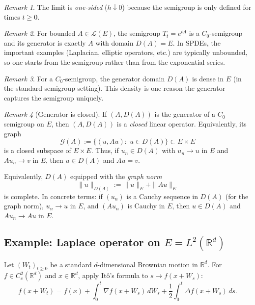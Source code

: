 \documentclass[11pt]{article}
\theoremstyle{definition}
\theoremstyle{remark}
\newtheorem{remark}{Remark}
\begin{document}
\begin{remark}
The limit is \emph{one-sided} ($h\downarrow 0$) because the semigroup is only defined for times $t\ge 0$.
\end{remark}

\begin{remark}
For bounded $A\in\mathcal{L}(E)$, the semigroup $T_t=e^{tA}$ is a $C_0$-semigroup and its generator is exactly $A$ with domain $D(A)=E$.
In SPDEs, the important examples (Laplacian, elliptic operators, etc.) are typically unbounded, so one starts from the semigroup rather than from the exponential series.
\end{remark}

\begin{remark}
For a $C_0$-semigroup, the generator domain $D(A)$ is dense in $E$ (in the standard semigroup setting).
This density is one reason the generator captures the semigroup uniquely.
\end{remark}

\begin{remark}[Generator is closed]
If $(A,D(A))$ is the generator of a $C_0$-semigroup on $E$, then $(A,D(A))$ is a \emph{closed} linear operator.
Equivalently, its graph
\[
    \mathcal{G}(A)
    :=
    \{(u,Au):\; u\in D(A)\}
    \subset E\times E
\]
is a closed subspace of $E\times E$.
Thus, if $u_n\in D(A)$ with $u_n\to u$ in $E$ and $Au_n\to v$ in $E$, then $u\in D(A)$ and $Au=v$.

Equivalently, $D(A)$ equipped with the \emph{graph norm}
\[
    \|u\|_{D(A)} := \|u\|_E + \|Au\|_E
\]
is complete. In concrete terms: if $(u_n)$ is a Cauchy sequence in $D(A)$ (for the graph norm), $u_n\to u$ in $E$, and $(Au_n)$ is Cauchy in $E$,
then $u\in D(A)$ and $Au_n\to Au$ in $E$.
\end{remark}

\subsection*{Example: Laplace operator on $E=L^2(\mathbb{R}^d)$}

Let $(W_t)_{t\ge 0}$ be a standard $d$-dimensional Brownian motion in $\mathbb{R}^d$.
For $f \in C_c^2(\mathbb{R}^d)$ and $x\in\mathbb{R}^d$, apply It\^o's formula to $s\mapsto f(x+W_s)$:
\begin{equation}\label{eq:ito-heat-example}
    f(x+W_t)
    =
    f(x)
    + \int_0^t \nabla f(x+W_s)\,dW_s
    + \frac12 \int_0^t \Delta f(x+W_s)\,ds.
\end{equation}
\end{document}
